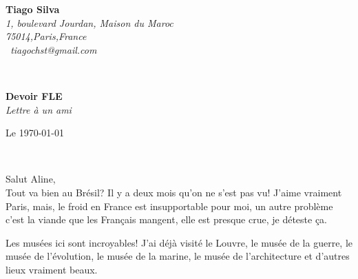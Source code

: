 \documentclass[11pt]{article}
\begin{document}
\date{Le 5 avril}

\hfill%
\begin{minipage}[t]{.6\textwidth}
\raggedleft%
{\bfseries Tiago Silva}\\[.35ex]
\small\itshape%
1, boulevard Jourdan, Maison du Maroc\\
75014,Paris,France\\[.35ex]
\Letter~tiagochst@gmail.com
\end{minipage}\\[1em]
%
\begin{minipage}[t]{.4\textwidth}
\raggedright%
{\bfseries Devoir FLE}\\[.35ex]
\small\itshape%
Lettre à un ami\\
\end{minipage}
\hfill %
\begin{minipage}[t]{.4\textwidth}
\raggedleft %
Le \today
\end{minipage}\\[2em]
\raggedright


%



Salut Aline,\\[1.5em]




{\color{red}Tout} va bien au Brésil? Il y a deux mois {\color{red}qu'on ne s'est pas vu}!
J'aime vraiment Paris,  mais, le froid en France est  insupportable pour moi, un
autre problème {\color{red}c}'est la viande que les {\color{red}Français} mangent, elle est presque 
cru{\color{red}e}, je déteste ça.

Les musées  ici sont  incroyables! J'ai déjà  visité le  Louvre, le musée  de la
guerre, le musée  {\color{red}de l'}évolution, le musée de la marine, le musée de l'architecture et d'autres lieux vraiment {\color{red}beaux}.
\end{document}
